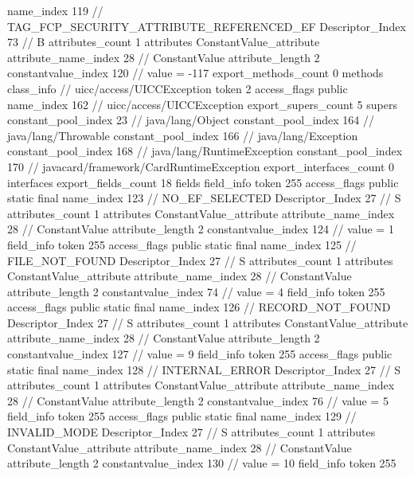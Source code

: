 {{{{{				name_index	119		// TAG_FCP_SECURITY_ATTRIBUTE_REFERENCED_EF
				Descriptor_Index	73		// B
				attributes_count	1
				attributes {
				ConstantValue_attribute {
					attribute_name_index	28		// ConstantValue
					attribute_length	2
					constantvalue_index	120		// value = -117
				}
				}
			}
			}
			export_methods_count	0
			methods {
			}
		}
		class_info {		// uicc/access/UICCException
			token	2
			access_flags	public
			name_index	162		// uicc/access/UICCException
			export_supers_count	5
			supers {
				constant_pool_index	23		// java/lang/Object
				constant_pool_index	164		// java/lang/Throwable
				constant_pool_index	166		// java/lang/Exception
				constant_pool_index	168		// java/lang/RuntimeException
				constant_pool_index	170		// javacard/framework/CardRuntimeException
			}
			export_interfaces_count	0
			interfaces {
			}
			export_fields_count	18
			fields {
			field_info {
				token	255
				access_flags	public static final
				name_index	123		// NO_EF_SELECTED
				Descriptor_Index	27		// S
				attributes_count	1
				attributes {
				ConstantValue_attribute {
					attribute_name_index	28		// ConstantValue
					attribute_length	2
					constantvalue_index	124		// value = 1
				}
				}
			}
			field_info {
				token	255
				access_flags	public static final
				name_index	125		// FILE_NOT_FOUND
				Descriptor_Index	27		// S
				attributes_count	1
				attributes {
				ConstantValue_attribute {
					attribute_name_index	28		// ConstantValue
					attribute_length	2
					constantvalue_index	74		// value = 4
				}
				}
			}
			field_info {
				token	255
				access_flags	public static final
				name_index	126		// RECORD_NOT_FOUND
				Descriptor_Index	27		// S
				attributes_count	1
				attributes {
				ConstantValue_attribute {
					attribute_name_index	28		// ConstantValue
					attribute_length	2
					constantvalue_index	127		// value = 9
				}
				}
			}
			field_info {
				token	255
				access_flags	public static final
				name_index	128		// INTERNAL_ERROR
				Descriptor_Index	27		// S
				attributes_count	1
				attributes {
				ConstantValue_attribute {
					attribute_name_index	28		// ConstantValue
					attribute_length	2
					constantvalue_index	76		// value = 5
				}
				}
			}
			field_info {
				token	255
				access_flags	public static final
				name_index	129		// INVALID_MODE
				Descriptor_Index	27		// S
				attributes_count	1
				attributes {
				ConstantValue_attribute {
					attribute_name_index	28		// ConstantValue
					attribute_length	2
					constantvalue_index	130		// value = 10
				}
				}
			}
			field_info {
				token	255
}}}}}
